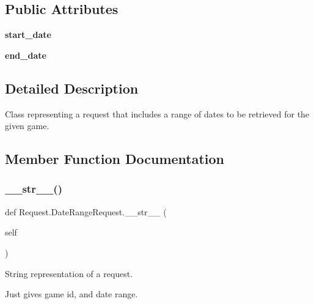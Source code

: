 \subsection*{Public Attributes}
\begin{DoxyCompactItemize}
\item 
\mbox{\label{class_request_1_1_date_range_request_a667ad2ef0f00da24694442cf2763eff8}} 
{\bfseries start\+\_\+date}
\item 
\mbox{\label{class_request_1_1_date_range_request_a59104452d705a5c4d6c874e644b7d414}} 
{\bfseries end\+\_\+date}
\end{DoxyCompactItemize}


\subsection{Detailed Description}
Class representing a request that includes a range of dates to be retrieved for the given game. 



\subsection{Member Function Documentation}
\mbox{\label{class_request_1_1_date_range_request_a0b6830007ee05d000d2ac4492003a46a}} 
\subsubsection{\texorpdfstring{\_\_str\_\_()}{\_\_str\_\_()}}
{\footnotesize\ttfamily def Request.\+Date\+Range\+Request.\+\_\+\+\_\+str\+\_\+\+\_\+ (\begin{DoxyParamCaption}\item[{}]{self }\end{DoxyParamCaption})}



String representation of a request. 

Just gives game id, and date range. \mbox{\label{class_request_1_1_date_range_request_a6225fcabddc26682a0964b9438d3e845}} 
